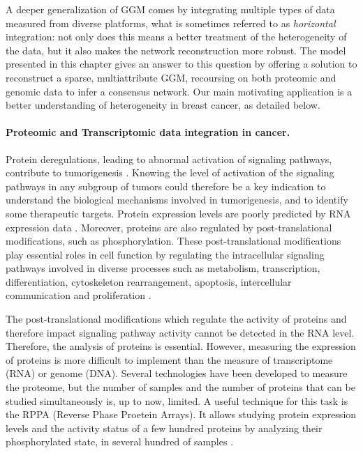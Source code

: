A deeper generalization of GGM comes by integrating multiple types of
data measured from diverse platforms, what is sometimes referred to as
\emph{horizontal} integration: not only does this means a better
treatment of the heterogeneity of the data, but it also makes the
network reconstruction more robust. The model presented in this
chapter gives an answer to this question by offering a solution to
reconstruct a sparse, multiattribute GGM, recoursing on both proteomic
and genomic data to infer a consensus network. Our main motivating
application is a better understanding of heterogeneity in breast
cancer, as detailed below.

\paragraph*{Proteomic and Transcriptomic data integration in cancer.} 
Protein deregulations, leading to abnormal activation of signaling
pathways, contribute to tumorigenesis
\citep{giancotti2014deregulation}. Knowing the level of activation of
the signaling pathways in any subgroup of tumors could therefore be a
key indication to understand the biological mechanisms involved in
tumorigenesis, and to identify some therapeutic targets.  Protein
expression levels are poorly predicted by RNA expression data
\citep{akbani2014pan}. Moreover, proteins are also regulated by
post-translational modifications, such as phosphorylation.  These
post-translational modifications play essential roles in cell function
by regulating the intracellular signaling pathways involved in diverse
processes such as metabolism, transcription, differentiation,
cytoskeleton rearrangement, apoptosis, intercellular communication and
proliferation \citep{johnson2009regulation}.

The post-translational modifications which regulate the activity of
proteins and therefore impact signaling pathway activity cannot be
detected in the RNA level.  Therefore, the analysis of proteins is
essential.  However, measuring the expression of proteins is more
difficult to implement than the measure of transcriptome (RNA) or
genome (DNA).  Several technologies have been developed to measure the
proteome, but the number of samples and the number of proteins that
can be studied simultaneously is, up to now, limited.  A useful
technique for this task is the RPPA (Reverse Phase Proetein
Arrays). It allows studying protein expression levels and the activity
status of a few hundred proteins by analyzing their phosphorylated
state, in several hundred of samples \citep{akbani2014realizing}.

